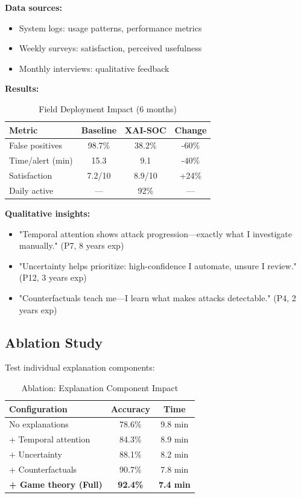 \documentclass[letterpaper,twocolumn,10pt]{article}
\begin{document}
\textbf{Data sources:}
\begin{itemize}
\item System logs: usage patterns, performance metrics
\item Weekly surveys: satisfaction, perceived usefulness
\item Monthly interviews: qualitative feedback
\end{itemize}

\textbf{Results:}

\begin{table}[h]
\centering
\caption{Field Deployment Impact (6 months)}
\begin{tabular}{lccc}
\toprule
Metric & Baseline & XAI-SOC & Change \\
\midrule
False positives & 98.7\% & 38.2\% & -60\% \\
Time/alert (min) & 15.3 & 9.1 & -40\% \\
Satisfaction & 7.2/10 & 8.9/10 & +24\% \\
Daily active & --- & 92\% & --- \\
\bottomrule
\end{tabular}
\end{table}

\textbf{Qualitative insights:}
\begin{itemize}
\item "Temporal attention shows attack progression—exactly what I investigate manually." (P7, 8 years exp)
\item "Uncertainty helps prioritize: high-confidence I automate, unsure I review." (P12, 3 years exp)
\item "Counterfactuals teach me—I learn what makes attacks detectable." (P4, 2 years exp)
\end{itemize}

\subsection{Ablation Study}

Test individual explanation components:

\begin{table}[h]
\centering
\caption{Ablation: Explanation Component Impact}
\begin{tabular}{lcc}
\toprule
Configuration & Accuracy & Time \\
\midrule
No explanations & 78.6\% & 9.8 min \\
+ Temporal attention & 84.3\% & 8.9 min \\
+ Uncertainty & 88.1\% & 8.2 min \\
+ Counterfactuals & 90.7\% & 7.8 min \\
\textbf{+ Game theory (Full)} & \textbf{92.4\%} & \textbf{7.4 min} \\
\bottomrule
\end{tabular}
\end{table}
\end{document}
